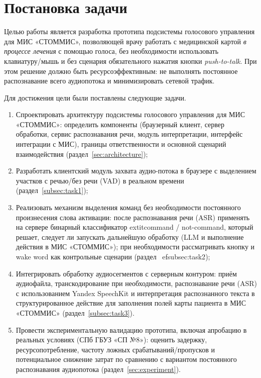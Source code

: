 
\clearpage

\section{Постановка задачи}
\label{sec:task}

Целью работы является разработка прототипа подсистемы голосового управления для МИС «СТОММИС», позволяющей врачу работать с медицинской картой \emph{в процессе лечения} с помощью голоса, без необходимости использовать клавиатуру/мышь и без сценария обязательного нажатия кнопки \emph{push-to-talk}.
При этом решение должно быть ресурсоэффективным: не выполнять постоянное распознавание всего аудиопотока и минимизировать сетевой трафик.

Для достижения цели были поставлены следующие задачи.
\begin{enumerate}
    \item Спроектировать архитектуру подсистемы голосового управления для МИС «СТОММИС»: определить компоненты (браузерный клиент, сервер обработки, сервис распознавания речи, модуль интерпретации, интерфейс интеграции с МИС), границы ответственности и основной сценарий взаимодействия (раздел~\ref{sec:architecture});
    \item Разработать клиентский модуль захвата аудио-потока в браузере с выделением участков с речью/без речи (VAD) в реальном времени (раздел~\ref{subsec:task1});

    \item Реализовать механизм выделения команд без необходимости постоянного произнесения слова активации: после распознавания речи (ASR) применять на сервере бинарный классификатор 	extit{command / not-command}, который решает, следует ли запускать дальнейшую обработку (LLM и выполнение действия в МИС «СТОММИС»); при необходимости рассматривать кнопку и wake word как контрольные сценарии (раздел~
ef{subsec:task2});

    \item Интегрировать обработку аудиосегментов с серверным контуром: приём аудиофайла, транскодирование при необходимости, распознавание речи (ASR) с использованием Yandex SpeechKit и интерпретация распознанного текста в структурированное действие для заполнения полей карты пациента в МИС «СТОММИС» (раздел~\ref{subsec:task3}).

    \item Провести экспериментальную валидацию прототипа, включая апробацию в реальных условиях (СПб ГБУЗ «СП №8»): оценить задержку, ресурсопотребление, частоту ложных срабатываний/пропусков и потенциальное снижение затрат по сравнению с вариантом постоянного распознавания аудиопотока (раздел~\ref{sec:experiment}).
\end{enumerate}

